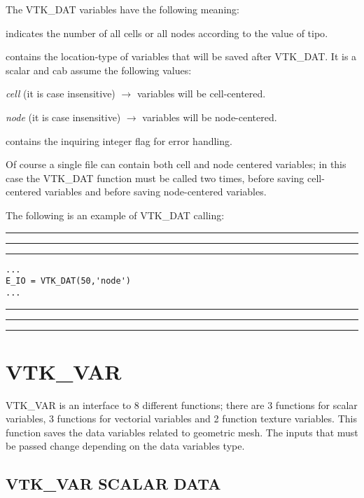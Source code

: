 \documentclass[pagesize=pdftex,fontsize=10pt,paper=a4,oneside]{scrbook}
\DeclareRobustCommand{\MarginNote}[1]{\marginpar{%
\slshape\footnotesize%
\parindent=0pt\lineskip=0pt\lineskiplimit=0pt%
\tolerance=2000\hyphenpenalty=300\exhyphenpenalty=300%
\doublehyphendemerits=100000\finalhyphendemerits=\doublehyphendemerits%
\raggedright\hspace{0pt}#1}}
\newenvironment{boxred}[1]%
               {%
                \noindent\hspace*{-0.025\textwidth}%
                \color{Maroon}%
                \rule[-5.8pt]{0.6pt}{6pt}\hspace*{-0.6pt}\rule{1.05\textwidth}{0.6pt}\hspace*{-0.6pt}\rule[-5.8pt]{0.6pt}{6pt}%
                \color{black}%
                \vspace*{0.6pt}\MarginNote{\color{Maroon}{#1}}%
               }%
               {%
                \noindent\hspace*{-0.025\textwidth}%
                \color{Maroon}%
                \rule[0pt]{0.6pt}{6pt}\hspace*{-0.6pt}\rule{1.05\textwidth}{0.6pt}\hspace*{-0.6pt}\rule[0pt]{0.6pt}{6pt}%
                \color{black}%
                \vspace*{2mm}%
               }
\newenvironment{enumerateABlu}%
{\def\theenumi{\textsc{\EnumFont\color{RoyalBlue}\Alph{enumi}}}%
\enumerate}%
{\endenumerate}
\begin{document}
The VTK\_DAT variables have the following meaning:

\begin{description}
 \item[{\color{RoyalBlue}NC\_NN}] indicates the number of all cells or all nodes according to the value of {\color{RoyalBlue}tipo}.
 \item[{\color{RoyalBlue}var\_location}] contains the location-type of variables that will be saved after VTK\_DAT. It is a scalar and cab assume the following values:
 \begin{enumerateABlu}
  \item \emph{cell} (it is case insensitive) $\rightarrow$ variables will be cell-centered.
  \item \emph{node} (it is case insensitive) $\rightarrow$ variables will be node-centered.
 \end{enumerateABlu}
 \item[{\color{RoyalBlue}E\_IO}] contains the inquiring integer flag for error handling.
\end{description}

Of course a single file can contain both cell and node centered variables; in this case the VTK\_DAT function must be called two times, before saving cell-centered variables and before saving node-centered variables.

The following is an example of VTK\_DAT calling:

\begin{boxred}{VTK\_DAT Calling}
\begin{verbatim}
...
E_IO = VTK_DAT(50,'node')
...
\end{verbatim}
\end{boxred}


\section{VTK\_VAR}

VTK\_VAR is an interface to 8 different functions; there are 3 functions for scalar variables, 3 functions for vectorial
variables and 2 function texture variables.
This function saves the data variables related to geometric mesh. The inputs that must be passed change depending on the data
variables type.

\subsection{VTK\_VAR SCALAR DATA}
\end{document}
